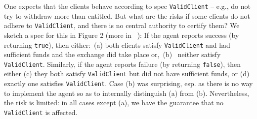 \documentclass[10pt]{article}
\newcommand{\prg}[1]{{\mbox{{{\tt #1}}}}}%
\begin{document}
\begin{multicols}{2}
One expects that the clients behave according to  spec \prg{ValidClient} --
e.g., do not try to withdraw more than entitled.
But what are the risks if some clients do not adhere to  \prg{ValidClient}, and there 
 is no central authority to certify them?
We sketch a spec for this  %
in Figure 2 (more in ~\cite{swapsies}):  
If the agent reports success (by returning \prg{true}), then either:\ (a)  both clients 
  satisfy  \prg{ValidClient} and had sufficient funds and 
the exchange did take place
 or,\  (b) \ neither
  satisfy  \prg{ValidClient}. 
Similarly, if the agent reports failure (by returning \prg{false}), then either (c) they both satisfy  \prg{ValidClient}  but did not have
sufficient funds, or (d) exactly one satisfies \prg{ValidClient}. 
Case (b) was surprising, esp. as  there is no way to implement the agent so as to internally distinguish  (a) from (b).
Nevertheless, the risk is limited: in all cases except (a), we have the guarantee that no  %
\prg{ValidClient}   %
is  affected.
  

\end{multicols}
\end{document}
